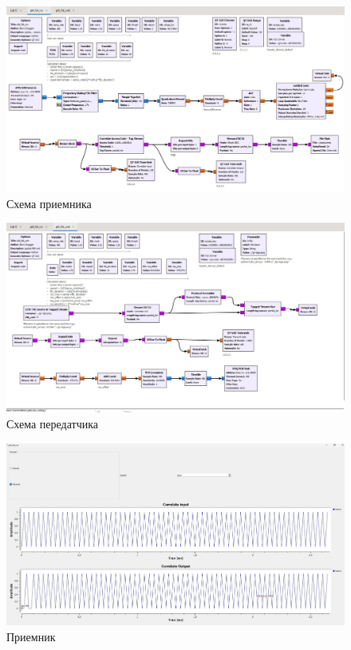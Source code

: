\documentclass{article}
\begin{document}
\begin{figure}[ht]
    \centering
    \includegraphics[width=0.8\linewidth]{4.png}
    \caption{Схема приемника}
    \label{fig:enter-label4}
\end{figure}

\begin{figure}[ht]
    \centering
    \includegraphics[width=0.8\linewidth]{5.png}
    \caption{Схема передатчика}
    \label{fig:enter-label5}
\end{figure}
\newpage





\newpage
\begin{figure}[ht]
    \centering
    \includegraphics[width=0.8\linewidth]{6.png}
    \caption{Приемник}
    \label{fig:enter-label6}
\end{figure}
\end{document}
